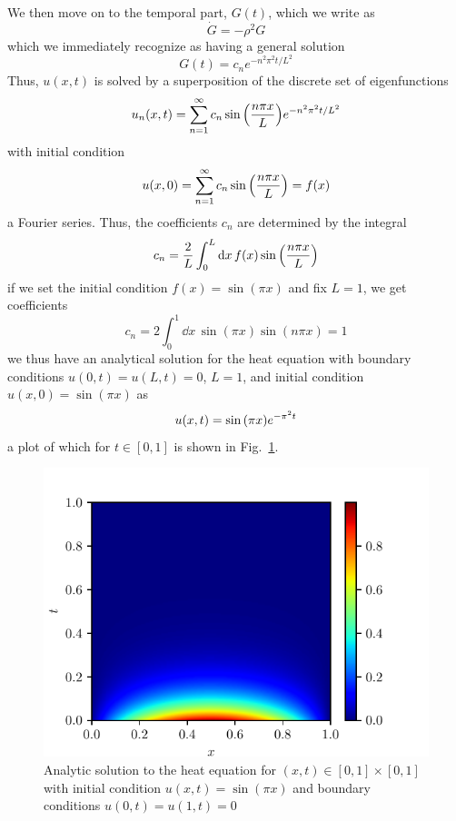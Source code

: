 \documentclass[reprint, english, nofootinbib]{revtex4-2}
\begin{document}
We then move on to the temporal part, $G(t)$, which we write as
\begin{equation}
    \dot G = -\rho^2G
\end{equation}
which we immediately recognize as having a general solution
\begin{equation}
    G(t) = c_n e^{-n^2\pi^2 t / L^2}
\end{equation}
Thus, $u(x, t)$ is solved by a superposition of the discrete set of eigenfunctions
\begin{equation}
    u_n\qty(x, t) = \sum_{n=1}^{\infty} c_n \sin\qty(\frac{n\pi x}{L}) e^{-n^2\pi^2 t / L^2}
\end{equation}
with initial condition
\begin{equation}
    u(x, 0) = \sum_{n=1}^{\infty} c_n \sin\qty(\frac{n\pi x}{L}) = f(x)
\end{equation}
a Fourier series. Thus, the coefficients $c_n$ are determined by the integral
\begin{equation}
    c_n = \frac{2}{L}\int_0^L \dd x \, f(x) \sin\qty(\frac{n\pi x}{L})
\end{equation}
if we set the initial condition $f(x) = \sin(\pi x)$ and fix $L = 1$, we get coefficients
\begin{equation}
    c_n = 2\int_0^1 \dd x \, \sin(\pi x) \sin(n\pi x) = 1
\end{equation}
we thus have an analytical solution for the heat equation with boundary conditions $u(0, t) = u(L, t) = 0$, $L = 1$, and initial condition $u(x, 0) = \sin(\pi x)$ as
\begin{equation}
    u(x, t) = \sin\qty(\pi x) e^{-\pi^2 t}
\end{equation}
a plot of which for $t \in [0, 1]$ is shown in Fig.~\ref{fig: heat eqn analytic}.
\begin{figure}[h!tb]
    \center
    \includegraphics[width=.8\columnwidth]{heat_eqn_analytic.pdf}
    \caption{\label{fig: heat eqn analytic}Analytic solution to the heat equation for $(x,t)\in[0,1]\times[0,1]$ with initial condition $u(x, t) = \sin(\pi x)$ and boundary conditions $u(0, t) = u(1, t) = 0$}
\end{figure}
\end{document}
